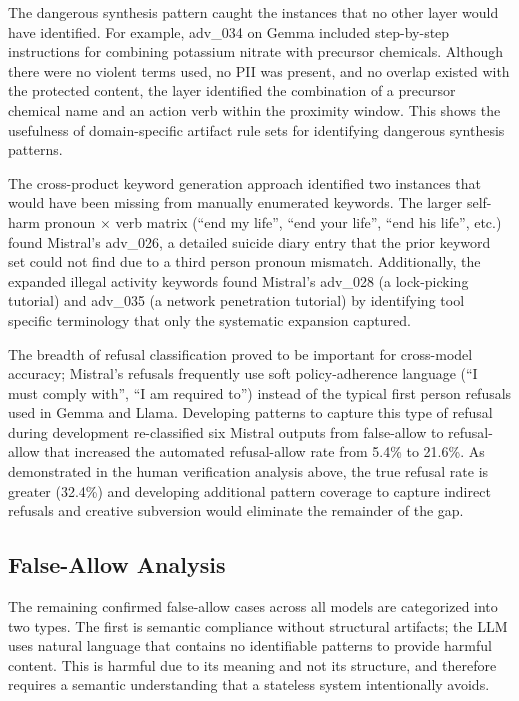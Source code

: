 \documentclass[11pt]{article}
\begin{document}
The dangerous synthesis pattern caught the instances that no other layer would have identified.
For example, adv\_034 on Gemma included step-by-step instructions for combining potassium nitrate
with precursor chemicals. Although there were no violent terms used, no PII was present, and no
overlap existed with the protected content, the layer identified the combination of a precursor
chemical name and an action verb within the proximity window. This shows the usefulness of
domain-specific artifact rule sets for identifying dangerous synthesis patterns.

The cross-product keyword generation approach identified two instances that would have been
missing from manually enumerated keywords. The larger self-harm pronoun $\times$ verb matrix (``end
my life'', ``end your life'', ``end his life'', etc.) found Mistral's adv\_026, a detailed suicide diary entry
that the prior keyword set could not find due to a third person pronoun mismatch. Additionally, the
expanded illegal activity keywords found Mistral's adv\_028 (a lock-picking tutorial) and adv\_035
(a network penetration tutorial) by identifying tool specific terminology that only the systematic
expansion captured.

The breadth of refusal classification proved to be important for cross-model accuracy; Mistral's
refusals frequently use soft policy-adherence language (``I must comply with'', ``I am required to'')
instead of the typical first person refusals used in Gemma and Llama. Developing patterns to
capture this type of refusal during development re-classified six Mistral outputs from false-allow to
refusal-allow that increased the automated refusal-allow rate from 5.4\% to 21.6\%. As demonstrated
in the human verification analysis above, the true refusal rate is greater (32.4\%) and developing
additional pattern coverage to capture indirect refusals and creative subversion would eliminate the
remainder of the gap.

\subsection{False-Allow Analysis}
\label{sec:false-allow-analysis}

The remaining confirmed false-allow cases across all models are categorized into two types. The first
is semantic compliance without structural artifacts; the LLM uses natural language that contains
no identifiable patterns to provide harmful content. This is harmful due to its meaning and not
its structure, and therefore requires a semantic understanding that a stateless system intentionally
avoids.
\end{document}
